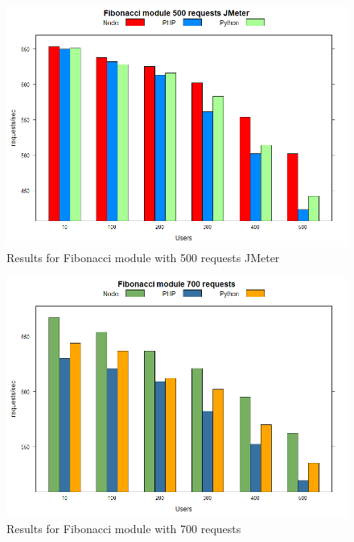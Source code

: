 \documentclass[../thesis.tex]{subfiles}
\begin{document}
\begin{figure}[H]
	\centering
	\includegraphics[width=1\textwidth]{../images/500requestsFiboJMeter.png}
	\caption{Results for Fibonacci module with 500 requests JMeter}
	\label{rys1}
\end{figure}
\begin{figure}[H]
	\centering
	\includegraphics[width=1\textwidth]{../images/700requestsFibo.png}
	\caption{Results for Fibonacci module with 700 requests}
	\label{rys1}
\end{figure}
\end{document}
